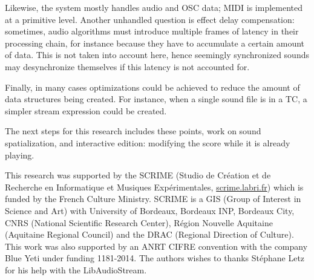 \documentclass{article}
\newcommand*{\timeconstraint}{\ac{TC}\xspace}
\begin{document}
Likewise, the system mostly handles audio and OSC data; MIDI is implemented at a primitive level.
Another unhandled question is effect delay compensation: sometimes, audio algorithms must introduce multiple frames of latency in their processing chain, for instance because they have to accumulate a certain amount of data.
This is not taken into account here, hence seemingly synchronized sounds may desynchronize themselves if this latency is not accounted for.

Finally, in many cases optimizations could be achieved to reduce the amount of data structures being created. For instance, when a single sound file is in a \timeconstraint, a simpler stream expression could be created.

The next steps for this research includes these points, work on sound spatialization, and interactive edition: modifying the score while it is already playing.

\begin{acknowledgments}\small
    This research was supported by the SCRIME (Studio de Cr\'eation et de Recherche en Informatique et Musiques Exp\'erimentales, \url{scrime.labri.fr}) which is funded by the French Culture Ministry. 
    SCRIME is a GIS (Group of Interest in Science and Art) with University of Bordeaux, 
    Bordeaux INP, Bordeaux City, CNRS (National Scientific Research Center), R\'egion Nouvelle Aquitaine (Aquitaine Regional Council) and the DRAC (Regional Direction of Culture).
	This work was also supported by an ANRT CIFRE convention with the company Blue Yeti under funding 1181-2014. 
    The authors wishes to thanks St\'ephane Letz for his help with the LibAudioStream.
\end{acknowledgments} 


\end{document}
